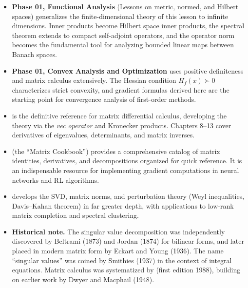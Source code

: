 \documentclass[11pt,a4paper]{article}
\begin{document}
\begin{itemize}
  \item \textbf{Phase 01, Functional Analysis} (Lessons on metric,
        normed, and Hilbert spaces) generalizes the finite-dimensional
        theory of this lesson to infinite dimensions.  Inner products
        become Hilbert space inner products, the spectral theorem
        extends to compact self-adjoint operators, and the operator norm
        becomes the fundamental tool for analyzing bounded linear maps
        between Banach spaces.

  \item \textbf{Phase 01, Convex Analysis and Optimization} uses
        positive definiteness and matrix calculus extensively.
        The Hessian condition $H_f(x) \succ 0$ characterizes strict
        convexity, and gradient formulas derived here are the starting
        point for convergence analysis of first-order methods.

  \item \citet{magnus2019} is the definitive reference for matrix
        differential calculus, developing the theory via the
        \emph{vec operator} and Kronecker products.  Chapters 8--13
        cover derivatives of eigenvalues, determinants, and matrix
        inverses.

  \item \citet{petersen2012} (the ``Matrix Cookbook'') provides a
        comprehensive catalog of matrix identities, derivatives, and
        decompositions organized for quick reference.  It is an
        indispensable resource for implementing gradient computations
        in neural networks and RL algorithms.

  \item \citet[Chapters 5--7]{horn2013} develops the SVD, matrix
        norms, and perturbation theory (Weyl inequalities, Davis--Kahan
        theorem) in far greater depth, with applications to
        low-rank matrix completion and spectral clustering.

  \item \textbf{Historical note.}  The singular value decomposition was
        independently discovered by Beltrami (1873) and Jordan (1874)
        for bilinear forms, and later placed in modern matrix form by
        Eckart and Young (1936).  The name ``singular values'' was
        coined by Smithies (1937) in the context of integral equations.
        Matrix calculus was systematized by \citet{magnus2019}
        (first edition 1988), building on earlier work by
        Dwyer and Macphail (1948).
\end{itemize}


\end{document}
